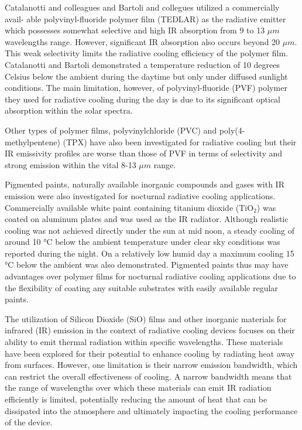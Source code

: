 Catalanotti and colleagues and Bartoli and collegues utilized a commercially avail- able polyvinyl-fluoride polymer film (TEDLAR) as the radiative emitter which possesses somewhat selective and high IR absorption from 9 to 13 $\mu m$ wavelengths range. However, significant IR absorption also occurs beyond 20 $\mu m$. This weak selectivity limits the radiative cooling efficiency of the polymer film. Catalanotti and Bartoli demonstrated a temperature reduction of 10 degrees Celsius below the ambient during the daytime but only under diffused sunlight conditions. The main limitation, however, of polyvinyl-fluoride (PVF) polymer they used for radiative cooling during the day is due to its significant optical absorption within the solar spectra.

Other types of polymer films, polyvinylchloride (PVC) and poly(4- methylpentene) (TPX) have also been investigated for radiative cooling but their IR emissivity profiles are worse than those of PVF in terms of selectivity and strong emission within the vital 8-13 $\mu m$ range.

Pigmented paints, naturally available inorganic compounds and gases with IR emission were also investigated for nocturnal radiative cooling applications. Commercially available white paint containing titanium dioxide (TiO$_2$) was coated on aluminum plates and was used as the IR radiator. Although realistic cooling was not achieved directly under the sun at mid noon, a steady cooling of around 10 °C below the ambient temperature under clear sky conditions was reported during the night. On a relatively low humid day a maximum cooling 15 °C below the ambient was also demonstrated. Pigmented paints thus may have advantages over polymer films for nocturnal radiative cooling applications due to the flexibility of coating any suitable substrates with easily available regular paints.

The utilization of Silicon Dioxide (SiO) films and other inorganic materials for infrared (IR) emission in the context of radiative cooling devices focuses on their ability to emit thermal radiation within specific wavelengths. These materials have been explored for their potential to enhance cooling by radiating heat away from surfaces. However, one limitation is their narrow emission bandwidth, which can restrict the overall effectiveness of cooling. A narrow bandwidth means that the range of wavelengths over which these materials can emit IR radiation efficiently is limited, potentially reducing the amount of heat that can be dissipated into the atmosphere and ultimately impacting the cooling performance of the device.


